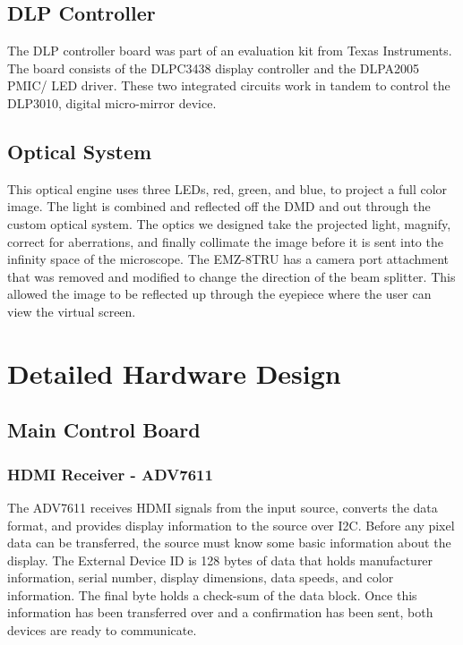\documentclass[12pt,a4paper]{article}
\begin{document}
\subsection{DLP Controller}
The DLP controller board was part of an evaluation kit from Texas Instruments. The board consists of the DLPC3438 display controller and the DLPA2005 PMIC/ LED driver. These two integrated circuits work in tandem to control the DLP3010, digital micro-mirror device.

\subsection{Optical System}
This optical engine uses three LEDs, red, green, and blue, to project a full color image. The light is combined and reflected off the DMD and out through the custom optical system. The optics we designed take the projected light, magnify, correct for aberrations, and finally collimate the image before it is sent into the infinity space of the microscope. The EMZ-8TRU has a camera port attachment that was removed and modified to change the direction of the beam splitter. This allowed the image to be reflected up through the eyepiece where the user can view the virtual screen.




\section{Detailed Hardware Design}

\subsection{Main Control Board}
\subsubsection{HDMI Receiver - ADV7611}
The ADV7611 receives HDMI signals from the input source, converts the data format, and provides display information to the source over I2C. Before any pixel data can be transferred, the source must know some basic information about the display. The External Device ID is 128 bytes of data that holds manufacturer information, serial number, display dimensions, data speeds, and color information. The final byte holds a check-sum of the data block. Once this information has been transferred over and a confirmation has been sent, both devices are ready to communicate.
\end{document}
